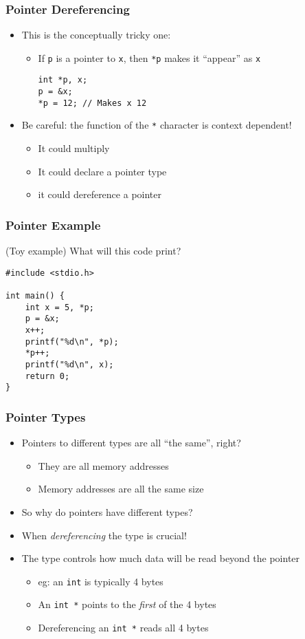 \documentclass[14pt]{beamer}
\begin{document}
\begin{frame}[fragile]
\frametitle{Pointer Dereferencing}
\begin{itemize}
\item This is the conceptually tricky one:
	\begin{itemize}
		\item If \texttt{p} is a pointer to \texttt{x}, then \texttt{*p} makes it ``appear'' as \texttt{x}
		\begin{lstlisting}[style=CStyle]
int *p, x;
p = &x;
*p = 12; // Makes x 12
\end{lstlisting}
	\end{itemize}
\item Be careful: the function of the \texttt{*} character is context dependent!
	\begin{itemize}
		\item It could multiply
		\item It could declare a pointer type
		\item it could dereference a pointer
	\end{itemize}
\end{itemize}
\end{frame}

\begin{frame}[fragile]
\frametitle{Pointer Example}
(Toy example) What will this code print?
\begin{lstlisting}[style=CStyle]
#include <stdio.h>

int main() {
	int x = 5, *p;
	p = &x;
	x++;
	printf("%d\n", *p);
	*p++;
	printf("%d\n", x);
	return 0;
}
\end{lstlisting}
\end{frame}

\begin{frame}
\frametitle{Pointer Types}
\begin{itemize}
\item Pointers to different types are all ``the same'', right?
	\begin{itemize}
		\item They are all memory addresses
		\item Memory addresses are all the same size
	\end{itemize}
\pause
\item So why do pointers have different types?
\pause
\item When \textit{dereferencing} the type is crucial!
\item The type controls how much data will be read beyond the pointer
	\begin{itemize}
		\item eg: an \texttt{int} is typically 4 bytes
		\item An \texttt{int *} points to the \textit{first} of the 4 bytes
		\item Dereferencing an \texttt{int *} reads all 4 bytes
	\end{itemize}
\end{itemize}
\end{frame}
\end{document}
